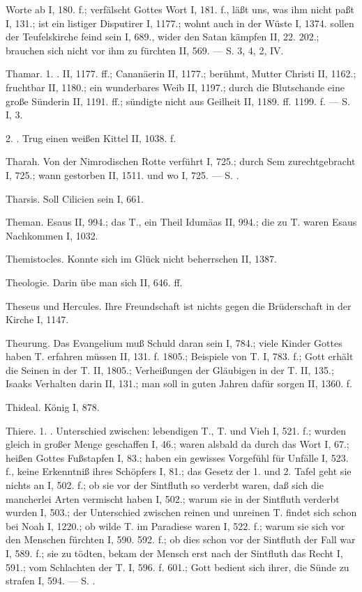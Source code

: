 Worte ab I, 180. f.; verfälscht Gottes Wort I, 181. f., läßt uns, was ihm nicht paßt I, 131.; ist ein listiger Disputirer I, 1177.; wohnt auch in der Wüste I, 1374.  sollen der Teufelskirche feind sein I, 689., wider den Satan kämpfen II, 22. 202.; brauchen sich nicht vor ihm zu fürchten II, 569. — S.  3, 4,  2,  IV.

Thamar. 1. . II, 1177. ff.; Cananäerin II, 1177.; berühmt, Mutter Christi II, 1162.; fruchtbar II, 1180.; ein wunderbares Weib II, 1197.; durch die Blutschande eine große Sünderin II, 1191. ff.; sündigte nicht aus Geilheit II, 1189. ff. 1199. f. — S.  I, 3.

2. . Trug einen weißen Kittel II, 1038. f.

Tharah. Von der Nimrodischen Rotte verführt I, 725.; durch Sem zurechtgebracht I, 725.; wann gestorben II, 1511. und wo I, 725. — S. .

Tharsis. Soll Cilicien sein I, 661.

Theman.  Esaus II, 994.; das  T., ein Theil Idumäas II, 994.; die  zu T. waren Esaus Nachkommen I, 1032.

Themistocles. Konnte sich im Glück nicht beherrschen II, 1387.

Theologie. Darin übe man sich II, 646. ff.

Theseus und Hercules. Ihre Freundschaft ist nichts gegen die Brüderschaft in der Kirche I, 1147.

Theurung. Das Evangelium muß Schuld daran sein I, 784.; viele Kinder Gottes haben T. erfahren müssen II, 131. f. 1805.; Beispiele von T. I, 783. f.; Gott erhält die Seinen in der T. II, 1805.; Verheißungen der Gläubigen in der T. II, 135.; Isaaks Verhalten darin II, 131.; man soll in guten Jahren dafür sorgen II, 1360. f.

Thideal. König I, 878.

Thiere. 1. . Unterschied zwischen: lebendigen T., T. und Vieh I, 521. f.; wurden gleich in großer Menge geschaffen I, 46.; waren alsbald da durch das Wort I, 67.; heißen Gottes Fußstapfen I, 83.; haben ein gewisses Vorgefühl für Unfälle I, 523. f., keine Erkenntniß ihres Schöpfers I, 81.; das Gesetz der 1. und 2. Tafel geht sie nichts an I, 502. f.; ob sie vor der Sintfluth so verderbt waren, daß sich die mancherlei Arten vermischt haben I, 502.; warum sie in der Sintfluth verderbt wurden I, 503.; der Unterschied zwischen reinen und unreinen T. findet sich schon bei Noah I, 1220.; ob wilde T. im Paradiese waren I, 522. f.; warum sie sich vor den Menschen fürchten I, 590. 592. f.; ob dies schon vor der Sintfluth der Fall war I, 589. f.; sie zu tödten, bekam der Mensch erst nach der Sintfluth das Recht I, 591.; vom Schlachten der T. I, 596. f. 601.; Gott bedient sich ihrer, die Sünde zu strafen I, 594. — S. .

